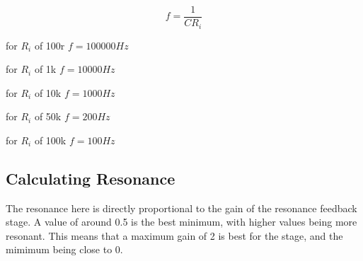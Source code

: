 \documentclass{article}
\begin{document}
\begin{equation}
  f = \frac{1}{CR_i}
\end{equation}

\begin{description}
  \item for $R_i$ of 100r $f = 100000Hz$
  \item for $R_i$ of 1k   $f = 10000Hz$
  \item for $R_i$ of 10k  $f = 1000Hz$
  \item for $R_i$ of 50k  $f = 200Hz$
  \item for $R_i$ of 100k $f = 100Hz$
\end{description}

\subsection{Calculating Resonance}

The resonance here is directly proportional to the gain of the resonance feedback stage. A value of around 0.5 is the best minimum, with higher values being more resonant. This means that a maximum gain of 2 is best for the stage, and the mimimum being close to 0.
\end{document}
